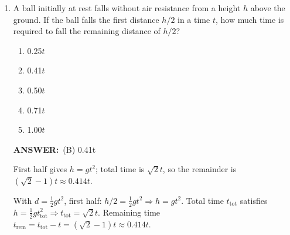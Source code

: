 ﻿\documentclass[12pt, a4paper]{article}
\makeatletter
\newcommand{\finalanswer}[1]{\textbf{ANSWER:}~#1}
\newif\if@categoryprinted
\newcommand{\category}[1]{\if@categoryprinted\relax\else\textit{\textcolor{gray}{Category: #1}}\global\@categoryprintedtrue\fi}
\makeatother
\begin{document}
\begin{CJK*}{UTF8}{gbsn}
\begin{enumerate}[itemsep=1.0em, topsep=0.6em]
\category{RC Circuits}
\begin{answerbox}
\finalanswer{(D) 7 volts}
\end{answerbox}
\begin{insightbox}
KVL: $\varepsilon=V_R+V_C$. With $I$ known, find $V_R=IR$ then $V_C$.
\end{insightbox}
\begin{solutionbox}

KVL: $\varepsilon - V_R - V_C = 0$. With $I=0.50\,\text{A}$ and $R=10.0\,\Omega$, $V_R=IR=5.0\,\text{V}$. Hence $V_C=\varepsilon - V_R = 12-5=7\,\text{V}$.
\end{solutionbox}

\newpage

\item \label{prob:13}
A ball initially at rest falls without air resistance from a height $h$ above the ground. If the ball falls the first distance $h/2$ in a time $t$, how much time is required to fall the remaining distance of $h/2$?
\begin{enumerate}[label=(\Alph*)]
    \item 0.25$t$
    \item 0.41$t$
    \item 0.50$t$
    \item 0.71$t$
    \item 1.00$t$
\end{enumerate}

\category{Kinematics}
\begin{answerbox}
\finalanswer{(B) 0.41t}
\end{answerbox}
\begin{insightbox}
First half gives $h=gt^2$; total time is $\sqrt2 t$, so the remainder is $(\sqrt2-1)t\approx0.414t$.
\end{insightbox}
\begin{solutionbox}

With $d=\tfrac{1}{2}gt^2$, first half: $h/2=\tfrac{1}{2}gt^2\Rightarrow h=gt^2$. Total time $t_{\text{tot}}$ satisfies $h=\tfrac{1}{2}g t_{\text{tot}}^2\Rightarrow t_{\text{tot}}=\sqrt{2}t$. Remaining time $t_{\text{rem}}=t_{\text{tot}}-t=(\sqrt{2}-1)t\approx 0.414t$.
\end{solutionbox}


\end{enumerate}
\end{CJK*}
\end{document}
